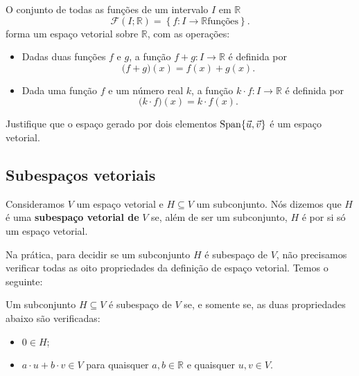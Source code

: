 \documentclass[../livro.tex]{subfiles}  %
\begin{document}
\begin{example}\label{funcoes}
  O conjunto de todas as funções de um intervalo $I$ em $\mathbb{R}$
  \begin{equation}
    \mathcal{F} (I;\mathbb{R}) = \left\{ f: I \to \mathbb{R} \text{funções} \right\}.  
  \end{equation}
  forma um espaço vetorial sobre $\mathbb{R}$, com as operações:
  \begin{itemize}
  \item Dadas duas funções $f$ e $g$, a função $f+g : I \to \mathbb{R}$ é definida por
    \begin{equation}
    \big( f+g \big) (x) = f(x) + g(x).
    \end{equation}
  \item Dada uma função $f$ e um número real $k$, a função $k \cdot f : I \to \mathbb{R}$ é definida por
    \begin{equation}
    \big( k \cdot f \big) (x) = k \cdot f(x).
    \end{equation}
  \end{itemize}
\end{example}


\begin{exercise}
	Justifique que o espaço gerado por dois elementos $\operatorname{Span} \{ \vec{u}, \vec{v} \}$ é um espaço vetorial.
\end{exercise}


\subsection{Subespaços vetoriais}

Consideramos $V$ um espaço vetorial e $H\subseteq V$ um subconjunto. Nós dizemos que $H$ é uma \textbf{subespaço vetorial de} $V$ se, além de ser um subconjunto, $H$ é por si só um espaço vetorial.

Na prática, para decidir se um subconjunto $H$ é subespaço de $V$, não precisamos verificar todas as oito propriedades da definição de espaço vetorial. Temos o seguinte:

\begin{theorem}
	Um subconjunto $H \subseteq V$ é subespaço de $V$ se, e somente se, as duas propriedades abaixo são verificadas:
	\begin{itemize}
		\item $0 \in H$;
		\item $a\cdot u + b \cdot v \in V$ para quaisquer $a, b \in \mathbb{R}$ e quaisquer $u,v \in V$.
	\end{itemize}
\end{theorem}
\end{document}

